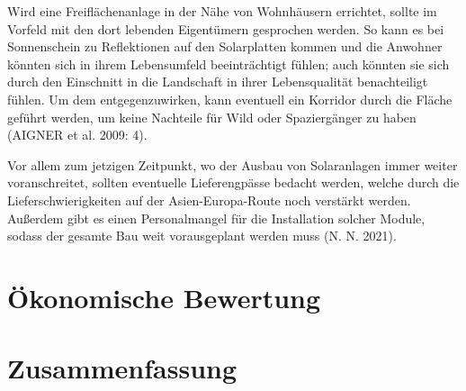 \documentclass[11pt]{scrartcl}
\begin{document}
Wird eine Freiflächenanlage in der Nähe von Wohnhäusern errichtet, sollte im Vorfeld mit den dort lebenden Eigentümern gesprochen werden.
So kann es bei Sonnenschein zu Reflektionen auf den Solarplatten kommen und die Anwohner könnten sich in ihrem Lebensumfeld beeinträchtigt fühlen; auch könnten sie sich durch den Einschnitt in die Landschaft in ihrer Lebensqualität benachteiligt fühlen.
Um dem entgegenzuwirken, kann eventuell ein Korridor durch die Fläche geführt werden, um keine Nachteile für Wild oder Spaziergänger zu haben (AIGNER et al. 2009: 4).
 
Vor allem zum jetzigen Zeitpunkt, wo der Ausbau von Solaranlagen immer weiter voranschreitet, sollten eventuelle Lieferengpässe bedacht werden, welche durch die Lieferschwierigkeiten auf der Asien-Europa-Route noch verstärkt werden.
Außerdem gibt es einen Personalmangel für die Installation solcher Module, sodass der gesamte Bau weit vorausgeplant werden muss (N. N. 2021).


\section{Ökonomische Bewertung}

\section{Zusammenfassung}
\end{document}

